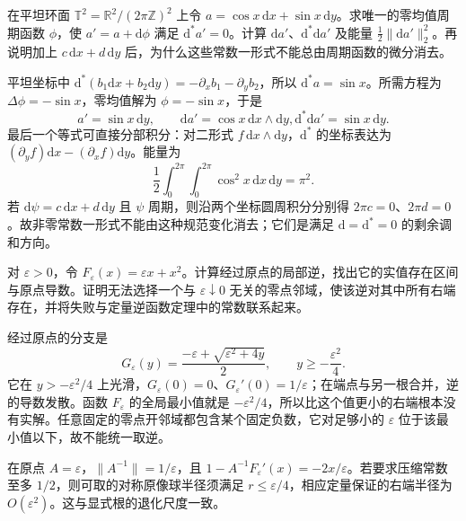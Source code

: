 \begin{exercise}\label{g3:ex:torus-gauge-representative}
	在平坦环面 \(\mathbb T^2=\mathbb R^2/(2\pi\mathbb Z)^2\) 上令
	\(a=\cos x\,\mathrm dx+\sin x\,\mathrm dy\)。求唯一的零均值周期函数 \(\phi\)，使 \(a'=a+\mathrm d\phi\) 满足 \(\mathrm d^*a'=0\)。计算 \(\mathrm da'\)、\(\mathrm d^*\mathrm da'\) 及能量 \(\tfrac12\|\mathrm da'\|_2^2\)。再说明加上 \(c\,\mathrm dx+d\,\mathrm dy\) 后，为什么这些常数一形式不能总由周期函数的微分消去。
\end{exercise}
\begin{solution}
	平坦坐标中 \(\mathrm d^*(b_1\mathrm dx+b_2\mathrm dy)=-\partial_xb_1-\partial_yb_2\)，所以 \(\mathrm d^*a=\sin x\)。所需方程为 \(\Delta\phi=-\sin x\)，零均值解为 \(\phi=-\sin x\)，于是
	\[
		a'=\sin x\,\mathrm dy,\qquad
		\mathrm da'=\cos x\,\mathrm dx\wedge\mathrm dy,
		\mathrm d^*\mathrm da'=\sin x\,\mathrm dy.
	\]
	最后一个等式可直接分部积分：对二形式 \(f\,\mathrm dx\wedge\mathrm dy\)，\(\mathrm d^*\) 的坐标表达为 \((\partial_yf)\mathrm dx-(\partial_xf)\mathrm dy\)。能量为
	\[
		\frac12\int_0^{2\pi}\int_0^{2\pi}\cos^2x\,\mathrm dx\,\mathrm dy=\pi^2.
	\]
	若 \(\mathrm d\psi=c\,\mathrm dx+d\,\mathrm dy\) 且 \(\psi\) 周期，则沿两个坐标圆周积分分别得 \(2\pi c=0\)、\(2\pi d=0\)。故非零常数一形式不能由这种规范变化消去；它们是满足 \(\mathrm d=\mathrm d^*=0\) 的剩余调和方向。
\end{solution}

\begin{exercise}\label{g3:ex:inverse-radius-degeneration}
	对 \(\varepsilon>0\)，令 \(F_\varepsilon(x)=\varepsilon x+x^2\)。计算经过原点的局部逆，找出它的实值存在区间与原点导数。证明无法选择一个与 \(\varepsilon\downarrow0\) 无关的零点邻域，使该逆对其中所有右端存在，并将失败与定量逆函数定理中的常数联系起来。
\end{exercise}
\begin{solution}
	经过原点的分支是
	\[
		G_\varepsilon(y)=\frac{-\varepsilon+\sqrt{\varepsilon^2+4y}}2,
		\qquad y\ge-\frac{\varepsilon^2}4.
	\]
	它在 \(y>-\varepsilon^2/4\) 上光滑，\(G_\varepsilon(0)=0\)、\(G_\varepsilon'(0)=1/\varepsilon\)；在端点与另一根合并，逆的导数发散。函数 \(F_\varepsilon\) 的全局最小值就是 \(-\varepsilon^2/4\)，所以比这个值更小的右端根本没有实解。任意固定的零点开邻域都包含某个固定负数，它对足够小的 \(\varepsilon\) 位于该最小值以下，故不能统一取逆。

	在原点 \(A=\varepsilon\)，\(\|A^{-1}\|=1/\varepsilon\)，且
	\(1-A^{-1}F_\varepsilon'(x)=-2x/\varepsilon\)。若要求压缩常数至多 \(1/2\)，则可取的对称原像球半径须满足 \(r\le\varepsilon/4\)，相应定量保证的右端半径为 \(O(\varepsilon^2)\)。这与显式根的退化尺度一致。
\end{solution}
